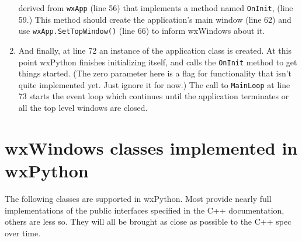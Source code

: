 \begin{enumerate}
derived from {\tt wxApp} (line 56) that implements a method named
{\tt OnInit}, (line 59.) This method should create the application's
main window (line 62) and use {\tt wxApp.SetTopWindow()} (line 66) to
inform wxWindows about it.
\item And finally, at line 72 an instance of the application class is
created. At this point wxPython finishes initializing itself, and calls
the {\tt OnInit} method to get things started. (The zero parameter here is
a flag for functionality that isn't quite implemented yet. Just
ignore it for now.)  The call to {\tt MainLoop} at line 73 starts the event
loop which continues until the application terminates or all the top
level windows are closed.
\end{enumerate}

\section{wxWindows classes implemented in wxPython}\label{wxpclasses}

The following classes are supported in wxPython. Most provide nearly
full implementations of the public interfaces specified in the C++
documentation, others are less so. They will all be brought as close
as possible to the C++ spec over time.

